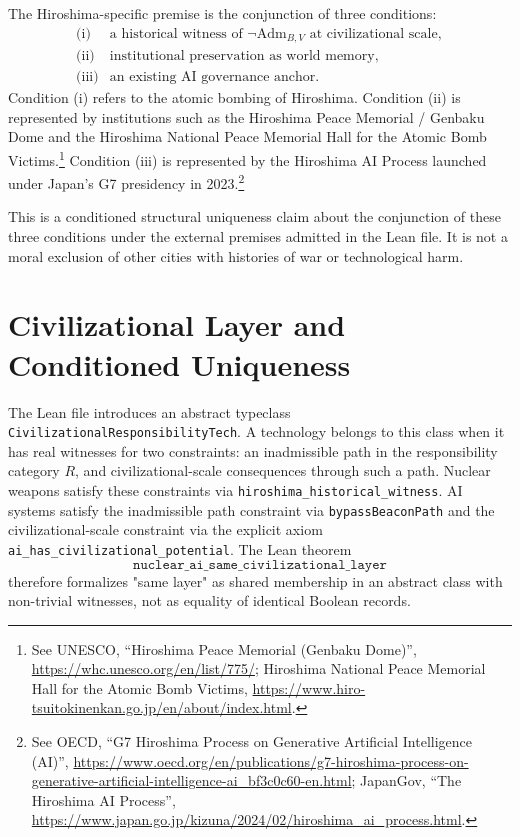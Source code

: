 \documentclass[11pt]{article}
\begin{document}
The Hiroshima-specific premise is the conjunction of three conditions:
\[
\begin{array}{ll}
\text{(i)} & \text{a historical witness of } \neg\mathrm{Adm}_{B,V}
             \text{ at civilizational scale},\\
\text{(ii)}& \text{institutional preservation as world memory},\\
\text{(iii)}& \text{an existing AI governance anchor.}
\end{array}
\]
Condition (i) refers to the atomic bombing of Hiroshima.  Condition (ii) is
represented by institutions such as the Hiroshima Peace Memorial / Genbaku Dome
and the Hiroshima National Peace Memorial Hall for the Atomic Bomb
Victims.\footnote{See UNESCO, ``Hiroshima Peace Memorial (Genbaku Dome)'',
\url{https://whc.unesco.org/en/list/775/}; Hiroshima National Peace Memorial
Hall for the Atomic Bomb Victims,
\url{https://www.hiro-tsuitokinenkan.go.jp/en/about/index.html}.}
Condition (iii) is represented by the Hiroshima AI Process launched under
Japan's G7 presidency in 2023.\footnote{See OECD, ``G7 Hiroshima Process on
Generative Artificial Intelligence (AI)'',
\url{https://www.oecd.org/en/publications/g7-hiroshima-process-on-generative-artificial-intelligence-ai_bf3c0c60-en.html};
JapanGov, ``The Hiroshima AI Process'',
\url{https://www.japan.go.jp/kizuna/2024/02/hiroshima_ai_process.html}.}

This is a conditioned structural uniqueness claim about the conjunction of
these three conditions under the external premises admitted in the Lean file.
It is not a moral exclusion of other cities with histories of war or
technological harm.

\section*{Civilizational Layer and Conditioned Uniqueness}

The Lean file introduces an abstract typeclass
\texttt{CivilizationalResponsibilityTech}.  A technology belongs to this class
when it has real witnesses for two constraints: an inadmissible path in the
responsibility category $R$, and civilizational-scale consequences through such
a path.  Nuclear weapons satisfy these constraints via
\texttt{hiroshima\_historical\_witness}.  AI systems satisfy the inadmissible
path constraint via \texttt{bypassBeaconPath} and the civilizational-scale
constraint via the explicit axiom
\texttt{ai\_has\_civilizational\_potential}.  The Lean theorem
\[
\texttt{nuclear\_ai\_same\_civilizational\_layer}
\]
therefore formalizes "same layer" as shared membership in an abstract class
with non-trivial witnesses, not as equality of identical Boolean records.
\end{document}
